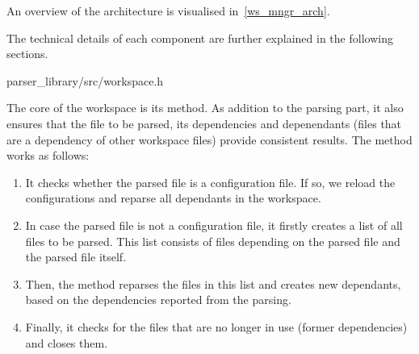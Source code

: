 An overview of the architecture is visualised in~\cref{ws_mngr_arch}.

The technical details of each component are further explained in the following sections.


{parser\_library/src/workspace.h}

The core of the workspace is its  method. As addition to the parsing part, it also ensures that the file to be parsed, its dependencies and depenendants (files that are a dependency of other workspace files) provide consistent results. The method works as follows:

\begin{enumerate}
	\item It checks whether the parsed file is a configuration file. If so, we reload the configurations and reparse all dependants in the workspace.
	\item In case the parsed file is not a configuration file, it firstly creates a list of all files to be parsed. This list consists of files depending on the parsed file and the parsed file itself.
	\item Then, the method reparses the files in this list and creates new dependants, based on the dependencies reported from the parsing.
	\item Finally, it checks for the files that are no longer in use (former dependencies) and closes them.
\end{enumerate}

